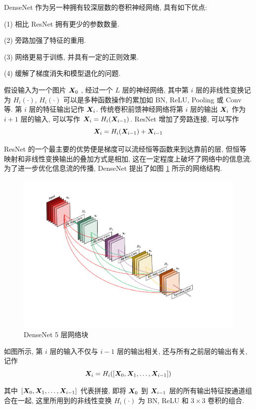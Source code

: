 \documentclass[12pt]{article}
\begin{document}
DenseNet 作为另一种拥有较深层数的卷积神经网络, 具有如下优点:

(1) 相比 ResNet 拥有更少的参数数量.

(2) 旁路加强了特征的重用.

(3) 网络更易于训练, 并具有一定的正则效果.

(4) 缓解了梯度消失和模型退化的问题.

假设输入为一个图片 $\bm{X}_0$ , 经过一个 $L$ 层的神经网络, 其中第 $i$ 层的非线性变换记为 $H_i(\cdot)$, $H_i(\cdot)$ 可以是多种函数操作的累加如 BN, ReLU, Pooling 或 Conv 等. 第 $i$ 层的特征输出记作 $\bm{X}_i$. 传统卷积前馈神经网络将第 $i$ 层的输出 $\bm{X}_i$ 作为 $i+1$ 层的输入, 可以写作 $\bm{X}_i=H_i(\bm{X}_{i-1})$. ResNet 增加了旁路连接, 可以写作
\begin{equation}
  \bm{X}_i=H_i(\bm{X}_{i-1})+\bm{X}_{i-1}
\end{equation}

ResNet 的一个最主要的优势便是梯度可以流经恒等函数来到达靠前的层, 但恒等映射和非线性变换输出的叠加方式是相加, 这在一定程度上破坏了网络中的信息流. 为了进一步优化信息流的传播, DenseNet 提出了如图 \ref{fig:dense_block} 所示的网络结构.
\begin{figure}[htbp]
  \centering
  \includegraphics[width=12cm]{denseBlock.pdf}
  \caption{DenseNet 5 层网络块}
  \label{fig:dense_block}
\end{figure}

如图所示, 第 $i$ 层的输入不仅与 $i-1$ 层的输出相关, 还与所有之前层的输出有关, 记作
\begin{equation}
  \bm{X}_i=H_i([\bm{X}_{0},\bm{X}_{1},\dots,\bm{X}_{i-1}])
\end{equation}

其中 $[\bm{X}_{0},\bm{X}_{1},\dots,\bm{X}_{i-1}]$ 代表拼接, 即将 $\bm{X}_0$ 到 $\bm{X}_{i-1}$ 层的所有输出特征按通道组合在一起, 这里所用到的非线性变换 $H_i(\cdot)$ 为 BN, ReLU 和 $3\times3$ 卷积的组合.
\end{document}
